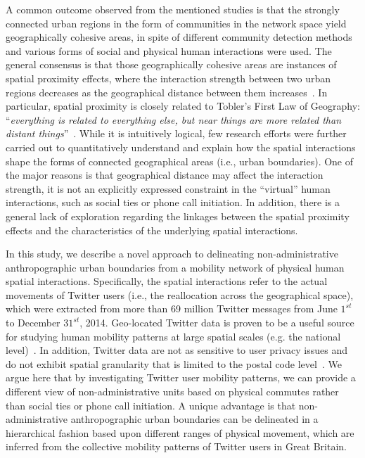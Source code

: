 \documentclass[]{tGIS2e}
\begin{document}
A common outcome observed from the mentioned studies is that the strongly connected urban regions in the form of communities in the network space yield geographically cohesive areas, in spite of different community detection methods and various forms of social and physical human interactions were used.
The general consensus is that those geographically cohesive areas are instances of spatial proximity effects, where the interaction strength between two urban regions decreases as the geographical distance between them increases~\citep{fotheringham1981}.
In particular, spatial proximity is closely related to Tobler's First Law of Geography: ``\textit{everything is related to everything else, but near things are more related than distant things}''~\citep{miller2004}.
While it is intuitively logical, few research efforts were further carried out to quantitatively understand and explain how the spatial interactions shape the forms of connected geographical areas (i.e., urban boundaries). 
One of the major reasons is that geographical distance may affect the interaction strength, it is not an explicitly expressed constraint in the ``virtual'' human interactions, such as social ties or phone call initiation.
In addition, there is a general lack of exploration regarding the linkages between the spatial proximity effects and the characteristics of the underlying spatial interactions. 

In this study, we describe a novel approach to delineating non-administrative anthropographic urban boundaries from a mobility network of physical human spatial interactions.
Specifically, the spatial interactions refer to the actual movements of Twitter users (i.e., the reallocation across the geographical space), which were extracted from more than 69 million Twitter messages from June $1^{st}$ to December $31^{st}$, 2014.
Geo-located Twitter data is proven to be a useful source for studying human mobility patterns at large spatial scales (e.g. the national level)~\citep{hawelka,jurdak2015}.
In addition, Twitter data are not as sensitive to user privacy issues and do not exhibit spatial granularity that is limited to the postal code level~\citep{thiemann}. 
We argue here that by investigating Twitter user mobility patterns, we can provide a different view of non-administrative units based on physical commutes rather than social ties or phone call initiation. 
A unique advantage is that non-administrative anthropographic urban boundaries can be delineated in a hierarchical fashion based upon different ranges of physical movement, which are inferred from the collective mobility patterns of Twitter users in Great Britain. 
\end{document}
